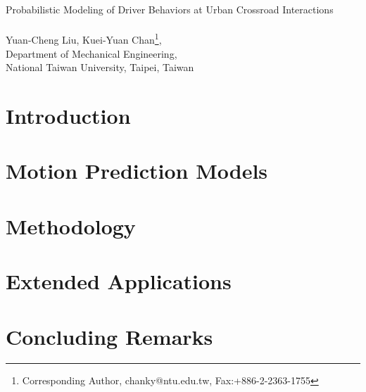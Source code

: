 \documentclass[a4paper,12pt]{article}
\begin{document}
\begin{center}
~\\~\\
{\Large {\sc Probabilistic Modeling of Driver Behaviors at Urban Crossroad Interactions }}\\~\\

\singlespacing
Yuan-Cheng Liu, Kuei-Yuan Chan\footnote{Corresponding Author,  chanky@ntu.edu.tw, Fax:+886-2-2363-1755}, \\
Department of Mechanical Engineering, \\
National Taiwan University, Taipei, Taiwan
\end{center}


\label{Abstract}


\newpage
\printunsrtglossary[type=symbols,style=long]

\newpage

\section{Introduction}
\label{sec:Intro}


\newpage

\section{Motion Prediction Models}
\label{sec:Lit}


\newpage

\section{Methodology}
\label{sec:Method}


\section{Extended Applications}
\label{sec:Extended Applications}


\section{Concluding Remarks}
\label{sec:Conclusion}

\end{document}
